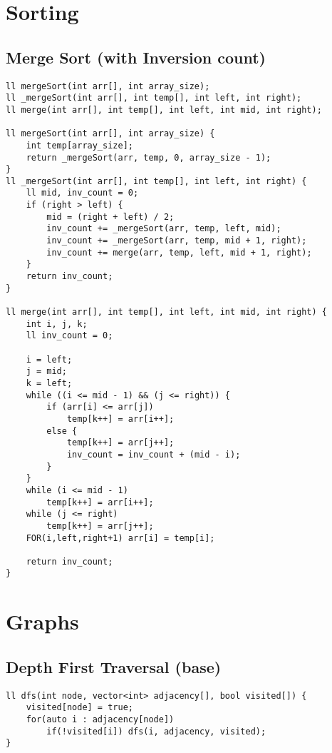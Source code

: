 \documentclass{article}
\begin{document}
    \section{Sorting}
        \subsection{Merge Sort (with Inversion count)}


        \begin{lstlisting}
ll mergeSort(int arr[], int array_size);
ll _mergeSort(int arr[], int temp[], int left, int right);
ll merge(int arr[], int temp[], int left, int mid, int right);

ll mergeSort(int arr[], int array_size) {
    int temp[array_size];
    return _mergeSort(arr, temp, 0, array_size - 1);
}
ll _mergeSort(int arr[], int temp[], int left, int right) {
    ll mid, inv_count = 0;
    if (right > left) {
        mid = (right + left) / 2;
        inv_count += _mergeSort(arr, temp, left, mid);
        inv_count += _mergeSort(arr, temp, mid + 1, right);
        inv_count += merge(arr, temp, left, mid + 1, right);
    }
    return inv_count;
}

ll merge(int arr[], int temp[], int left, int mid, int right) {
    int i, j, k;
    ll inv_count = 0;

    i = left;
    j = mid;
    k = left;
    while ((i <= mid - 1) && (j <= right)) {
        if (arr[i] <= arr[j])
            temp[k++] = arr[i++];
        else {
            temp[k++] = arr[j++];
            inv_count = inv_count + (mid - i);
        }
    }
    while (i <= mid - 1)
        temp[k++] = arr[i++];
    while (j <= right)
        temp[k++] = arr[j++];
    FOR(i,left,right+1) arr[i] = temp[i];

    return inv_count;
}       \end{lstlisting}


    \section{Graphs}
        \subsection{Depth First Traversal (base)}


        \begin{lstlisting}
ll dfs(int node, vector<int> adjacency[], bool visited[]) {
    visited[node] = true;
    for(auto i : adjacency[node])
        if(!visited[i]) dfs(i, adjacency, visited);
}       \end{lstlisting}
\end{document}
